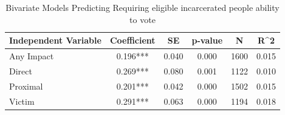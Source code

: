 \begin{table}

\caption{\label{tab:tab:jail_access_rev_bivariate}Bivariate Models Predicting Requiring eligible incarcerated people ability to vote}
\centering
\begin{tabular}[t]{lccccc}
\toprule
Independent Variable & Coefficient & SE & p-value & N & R\textasciicircum{}2\\
\midrule
Any Impact & 0.196*** & 0.040 & 0.000 & 1600 & 0.015\\
Direct & 0.269*** & 0.080 & 0.001 & 1122 & 0.010\\
Proximal & 0.201*** & 0.042 & 0.000 & 1502 & 0.015\\
Victim & 0.291*** & 0.063 & 0.000 & 1194 & 0.018\\
\bottomrule
\end{tabular}
\end{table}
